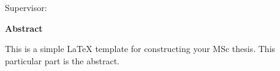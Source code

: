 \thispagestyle{plain}
\makeatletter
\begin{center}
    \Large
    \textbf{\@title}
    
    \vspace{0.4cm}
    \large
    Supervisor: \@supervisor
    
    \vspace{0.4cm}
    \textbf{\@author}
 \makeatother   

    \vspace{0.9cm}
    \textbf{Abstract}

This is a simple LaTeX template for constructing your MSc thesis. This particular part is the abstract.

\end{center}